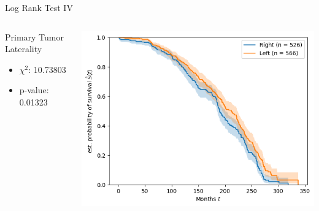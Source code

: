 \documentclass{beamer}
\begin{document}
\begin{frame}{Log Rank Test IV}
    \begin{columns}
        \begin{column}{0.49 \textwidth}
        Primary Tumor Laterality
        \begin{itemize}
            \item $\chi^2$: 10.73803
            \item p-value: 0.01323
        \end{itemize}
        \end{column}
        \begin{column}{0.49 \textwidth}
            \centering
            \includegraphics[width = \textwidth]{images/logrank4}
        \end{column}
    \end{columns}
\end{frame}
\end{document}

